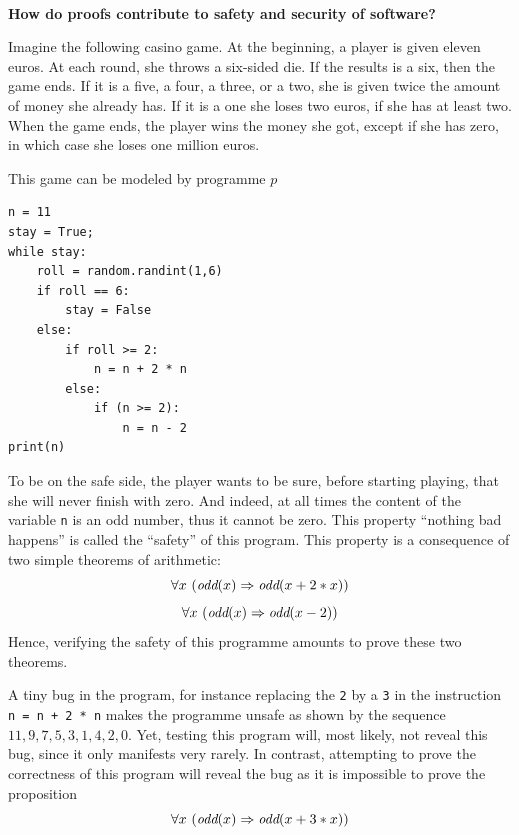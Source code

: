 \newpage
~\vfill
\begin{framed}
\vspace*{-0.5cm}
\begin{center}
{\bf \Large How do proofs contribute to safety and security of software?}
\end{center}

Imagine the following casino game. At the beginning, a player is given
eleven euros. At each round, she throws a six-sided die. If the results is a
six, then the game ends.  If it is a five, a four, a three, or a two,
she is given twice the amount of money she already has. If it is a one
she loses two euros, if she has at least two.  When the game ends,
the player wins the money she got, except if she has zero, in
which case she loses one million euros.

This game can be modeled by programme $p$
\begin{verbatim}
n = 11
stay = True;
while stay:
    roll = random.randint(1,6)
    if roll == 6:
        stay = False
    else:
        if roll >= 2:
            n = n + 2 * n
        else:
            if (n >= 2):
                n = n - 2
print(n)
\end{verbatim}

To be on the safe side, the player wants to be sure, before starting
playing, that she will never finish with zero.  And indeed, at all times
the content of the variable {\tt n} is an odd number,
thus it cannot be zero. This property ``nothing bad happens'' is
called the ``safety'' of this program. This property is a
consequence of two simple theorems of arithmetic:
$$\forall x~(\mbox{\it odd}(x) \Rightarrow \mbox{\it odd}(x + 2 * x))$$
$$\forall x~(\mbox{\it odd}(x) \Rightarrow \mbox{\it odd}(x - 2))$$
Hence, verifying the safety of this programme
amounts to prove these two theorems.

A tiny bug in the program, for instance replacing the {\tt 2} by a
{\tt 3} in the instruction {\tt n = n + 2 * n} makes the programme unsafe
as shown by the sequence $11, 9, 7, 5, 3, 1, 4, 2, 0$. Yet, testing
this program will, most likely, not reveal this bug, since it only manifests
very rarely.  In contrast, attempting to prove the correctness of this
program will
reveal the bug as it is impossible to prove the proposition
$$\forall x~(\mbox{\it odd}(x) \Rightarrow \mbox{\it odd}(x + 3 * x))$$
\end{framed}
\vfill~
\pagebreak
~\vfill
